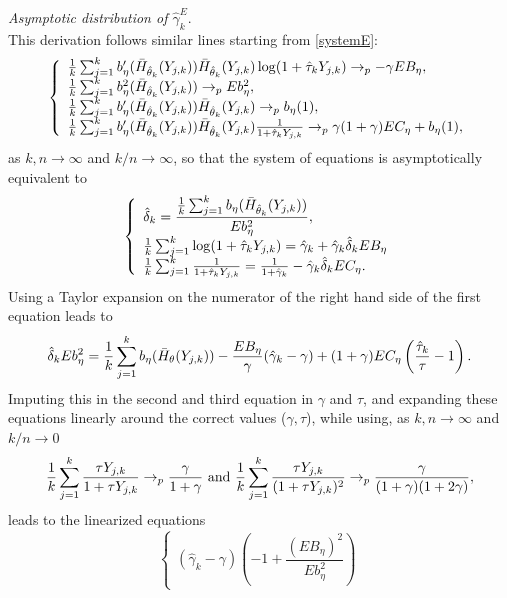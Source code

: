 \begin{subappendices}
\vspace{0.3cm}\noindent
{\it Asymptotic distribution of $\hat{\gamma}_k^{E}$}. 
\\ This derivation follows similar lines starting from \eqref{systemE}: 
 \[
\left\{
\begin{array}{l}
{1 \over k}\sum_{j=1}^k b'_{\eta}(\bar{H}_{\hat{\theta}_k}(Y_{j,k})) \bar{H}_{\hat{\theta}_k}(Y_{j,k}) \log (1+\hat{\tau}_k Y_{j,k}) \to_p -\gamma EB_\eta, \\
{1 \over k}\sum_{j=1}^k b^2_\eta (\bar{H}_{\hat{\theta}_k}(Y_{j,k})) \to_p Eb^2_{\eta}, \\
{1\over k}\sum_{j=1}^k b'_{\eta}(\bar{H}_{\hat{\theta}_k}(Y_{j,k}))\bar{H}_{\hat{\theta}_k}(Y_{j,k}) \to_p b_\eta (1), \\
{1\over k}\sum_{j=1}^k b'_{\eta}(\bar{H}_{\hat{\theta}_k}(Y_{j,k}))\bar{H}_{\hat{\theta}_k}(Y_{j,k}) {1 \over 1+\hat{\tau}_k Y_{j,k}}
\to_p \gamma(1+\gamma) EC_{\eta} + b_\eta (1),
\end{array}
\right.
\]
as $k,n\to \infty$ and $k/n\to \infty$,
so that the system of equations is asymptotically equivalent to
\[
\left\{
\begin{array}{l}
\hat{\delta}_k = \dfrac{{1 \over k}\sum_{j=1}^k b_\eta (\bar{H}_{\hat{\theta}_k}(Y_{j,k}))}{Eb^2_{\eta}}, \\
{1 \over k}\sum_{j=1}^k \log (1+\hat{\tau}_k Y_{j,k}) = 
\hat{\gamma}_k + \hat{\gamma}_k\hat{\delta}_kEB_{\eta}
\\
{1 \over k}\sum_{j=1}^k {1 \over 1+\hat{\tau}_k Y_{j,k}} =
{1 \over 1+ \hat{\gamma}_k}- \hat{\gamma}_k\hat{\delta}_k EC_{\eta}.
\end{array}
\right.
\]
Using a Taylor expansion on the numerator of the right hand side of the first equation leads to
\[
\hat{\delta}_k Eb^2_{\eta}=
{1 \over k } \sum_{j=1}^kb_{\eta}(\bar{H}_{\theta}(Y_{j,k}))
- {EB_{\eta} \over \gamma}(\hat{\gamma}_k -\gamma) 
+ (1+\gamma) EC_{\eta} \left({\hat{\tau}_k \over \tau}-1 \right).
\]
Imputing this in the second and third equation in $\gamma$ and $\tau$, and expanding these equations linearly around the correct values ($\gamma,\tau$), while using, as $k,n \to \infty$ and $k/n \to 0$ 
\[
{1 \over k}\sum_{j=1}^k {\tau Y_{j,k} \over 1+\tau Y_{j,k}}
\to_p {\gamma \over 1+\gamma} \mbox{ and }{1 \over k}\sum_{j=1}^k {\tau Y_{j,k} \over (1+\tau Y_{j,k})^2} \to_p {\gamma \over (1+\gamma)(1+2\gamma)}, \] 
leads to the linearized equations 
\begin{equation}
\left\{
\begin{array}{l}
\left(\hat{\gamma}_k - \gamma \right)\left(-1+ \dfrac{(EB_{\eta})^2}{Eb^2_{\eta}}\right)

\end{array}
\end{equation}
\end{subappendices}
